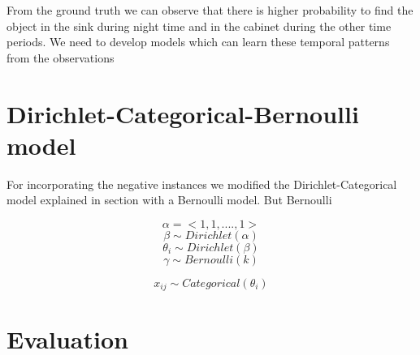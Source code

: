 From the ground truth we can observe that there is higher probability to find the object in the sink during night time and in the cabinet during the other time periods. We need to develop models which can learn these temporal patterns from the observations


\section{Dirichlet-Categorical-Bernoulli model}

For incorporating the negative instances we modified the Dirichlet-Categorical model explained in section  with a Bernoulli model. But Bernoulli 


\begin{minipage}{0.3\textwidth}
\centering


\end{minipage}%
\begin{minipage}{0.7\textwidth}

\begin{equation*}
	\alpha = <1, 1, .... , 1 > 
\end{equation*}
\begin{equation*}
	\beta \sim Dirichlet(\alpha)
\end{equation*}
\begin{equation*}
	\theta_i  \sim Dirichlet(\beta)
\end{equation*}
\begin{equation*}
	\gamma  \sim Bernoulli(k)
\end{equation*}

\begin{equation*}
	x_{ij} \sim Categorical(\theta_i)
\end{equation*}
\end{minipage}

\section{Evaluation}


